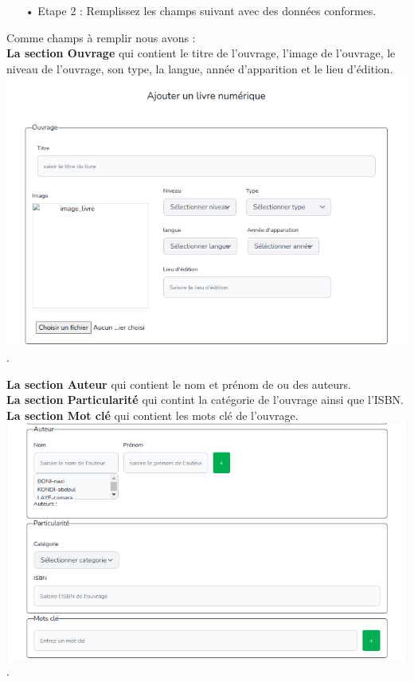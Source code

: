 \documentclass[12pt,a4paper]{article}
\begin{document}
\begin{itemize}
\item[•]Etape 2 : Remplissez les champs suivant avec des données conformes.
\end{itemize}

Comme champs à remplir nous avons :\\
\textbf{La section Ouvrage} qui contient le titre de l'ouvrage, l'image de l'ouvrage, le niveau de l'ouvrage, son type, la langue, année d'apparition et le lieu d’édition.\\
\includegraphics[scale=0.5]{images/Ajoutuvragelectro.png}.\\
\newpage

\textbf{La section Auteur} qui contient le nom et prénom de ou des auteurs.\\
\textbf{La section Particularité} qui contint la catégorie de l'ouvrage ainsi que l'ISBN.\\
\textbf{La section Mot clé} qui contient les mots clé de l'ouvrage. \\

\includegraphics[scale=0.5]{images/APMelectro.png}.\\
\end{document}
